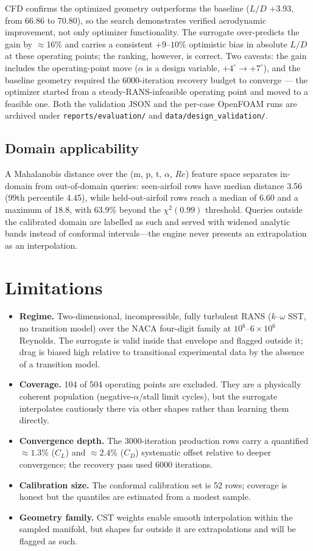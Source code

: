 \documentclass[11pt,a4paper]{article}
\begin{document}
CFD confirms the optimized geometry outperforms the baseline
($L/D$ +3.93, from 66.86 to 70.80), so the search demonstrates verified
aerodynamic improvement, not only optimizer functionality. The surrogate
over-predicts the gain by $\approx$16\% and carries a consistent $+9$--$10\%$
optimistic bias in absolute $L/D$ at these operating points; the ranking,
however, is correct. Two caveats: the gain includes the operating-point move
($\alpha$ is a design variable, $+4^\circ \to +7^\circ$), and the baseline
geometry required the 6000-iteration recovery budget to converge ---
the optimizer started from a steady-RANS-infeasible operating point and moved
to a feasible one. Both the validation JSON and the per-case OpenFOAM runs
are archived under \texttt{reports/evaluation/} and
\texttt{data/design\_validation/}.

\subsection{Domain applicability}

A Mahalanobis distance over the (m, p, t, $\alpha$, $Re$) feature space
separates in-domain from out-of-domain queries: seen-airfoil rows have median
distance 3.56 (99th percentile 4.45), while held-out-airfoil rows reach a
median of 6.60 and a maximum of 18.8, with 63.9\% beyond the
$\chi^2(0.99)$ threshold. Queries outside the calibrated domain are labelled
as such and served with widened analytic bands instead of conformal
intervals---the engine never presents an extrapolation as an interpolation.

\section{Limitations}

\begin{itemize}
\item \textbf{Regime.} Two-dimensional, incompressible, fully turbulent RANS
($k$--$\omega$ SST, no transition model) over the NACA four-digit family at
$10^6$--$6\times10^6$ Reynolds. The surrogate is valid inside that envelope
and flagged outside it; drag is biased high relative to transitional
experimental data by the absence of a transition model.
\item \textbf{Coverage.} 104 of 504 operating points are excluded. They are a
physically coherent population (negative-$\alpha$/stall limit cycles), but
the surrogate interpolates cautiously there via other shapes rather than
learning them directly.
\item \textbf{Convergence depth.} The 3000-iteration production rows carry a
quantified $\approx 1.3\%$ ($C_L$) and $\approx 2.4\%$ ($C_D$) systematic
offset relative to deeper convergence; the recovery pass used 6000 iterations.
\item \textbf{Calibration size.} The conformal calibration set is 52 rows;
coverage is honest but the quantiles are estimated from a modest sample.
\item \textbf{Geometry family.} CST weights enable smooth interpolation within
the sampled manifold, but shapes far outside it are extrapolations and will
be flagged as such.
\end{itemize}
\end{document}

